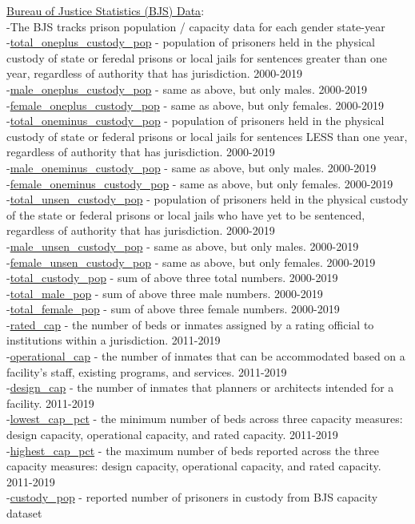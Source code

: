 \documentclass[10pt,a4paper]{article}
\begin{document}
\underline{Bureau of Justice Statistics (BJS) Data}: \\
-The BJS tracks prison population / capacity data for each gender state-year \\
-\underline{total\_oneplus\_custody\_pop} - population of prisoners held in the physical custody of state or feredal prisons or local jails for sentences greater than one year, regardless of authority that has jurisdiction. 2000-2019 \\
-\underline{male\_oneplus\_custody\_pop} - same as above, but only males. 2000-2019 \\
-\underline{female\_oneplus\_custody\_pop} -  same as above, but only females. 2000-2019 \\
-\underline{total\_oneminus\_custody\_pop} - population of prisoners held in the physical custody of state or federal prisons or local jails for sentences LESS than one year, regardless of authority that has jurisdiction. 2000-2019 \\
-\underline{male\_oneminus\_custody\_pop} - same as above, but only males. 2000-2019 \\
-\underline{female\_oneminus\_custody\_pop} - same as above, but only females. 2000-2019 \\
-\underline{total\_unsen\_custody\_pop} - population of prisoners held in the physical custody of the state or federal prisons or local jails who have yet to be sentenced, regardless of authority that has jurisdiction. 2000-2019 \\
-\underline{male\_unsen\_custody\_pop} - same as above, but only males. 2000-2019 \\
-\underline{female\_unsen\_custody\_pop} - same as above, but only females. 2000-2019 \\
-\underline{total\_custody\_pop} -  sum of above three total numbers. 2000-2019 \\
-\underline{total\_male\_pop} -  sum of above three male numbers. 2000-2019 \\
-\underline{total\_female\_pop} -  sum of above three female numbers. 2000-2019 \\
-\underline{rated\_cap} - the number of beds or inmates assigned by a rating official to institutions within a jurisdiction. 2011-2019 \\
-\underline{operational\_cap} - the number of inmates that can be accommodated based on a facility's staff, existing programs, and services. 2011-2019 \\
-\underline{design\_cap} - the number of inmates that planners or architects intended for a facility. 2011-2019 \\
-\underline{lowest\_cap\_pct} - the minimum number of beds across three capacity measures: design capacity, operational capacity, and rated capacity. 2011-2019 \\
-\underline{highest\_cap\_pct} - the maximum number of beds reported across the three capacity measures: design capacity, operational capacity, and rated capacity. 2011-2019 \\
-\underline{custody\_pop} - reported number of prisoners in custody from BJS capacity dataset \\
\\
\end{document}
